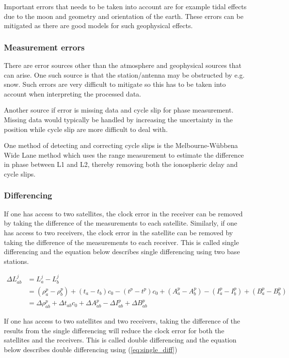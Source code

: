 \documentclass[12pt,a4paper]{article}
\begin{document}
Important errors that needs to be taken into account are for example tidal effects due to the moon and geometry and orientation of the earth.
These errors can be mitigated as there are good models for such geophysical effects.

\subsubsection{Measurement errors}
There are error sources other than the atmosphere and geophysical sources that can arise.
One such source is that the station/antenna may be obstructed by e.g. snow.
Such errors are very difficult to mitigate so this has to be taken into account when interpreting the processed data.

Another source if error is missing data and cycle slip for phase measurement.
Missing data would typically be handled by increasing the uncertainty in the position while cycle slip are more difficult to deal with.

One method of detecting and correcting cycle slips is the Melbourne-Wübbena Wide Lane method which uses the range measurement to estimate the difference in phase between L1 and L2, thereby removing both the ionospheric delay and cycle slips.

\subsubsection{Differencing}
If one has access to two satellites, the clock error in the receiver can be removed by taking the difference of the measurements to each satellite.
Similarly, if one has access to two receivers, the clock error in the satellite can be removed by taking the difference of the measurements to each receiver.
This is called single differencing and the equation below describes single differencing using two base stations.

\begin{align}
  \label{eq:single_diff}
  \Delta L_{ab}^j & = L_a^j - L_b^j \nonumber \\
                  & = (\rho_a^p-\rho_b^p) + (t_a-t_b)c_0-(t^p-t^p)c_0 + (A_a^p-A_b^p) - (I_a^p-I_b^p) + (B_a^p-B_b^p) \nonumber \\
                  & = \Delta \rho_{ab}^p + \Delta t_{ab}c_0 + \Delta A_{ab}^p - \Delta I_{ab}^p + \Delta B_{ab}^p
\end{align}

If one has access to two satellites and two receivers, taking the difference of the results from the single differencing will reduce the clock error for both the satellites and the receivers.
This is called double differencing and the equation below describes double differencing using (\ref{eq:single_diff})
\end{document}
